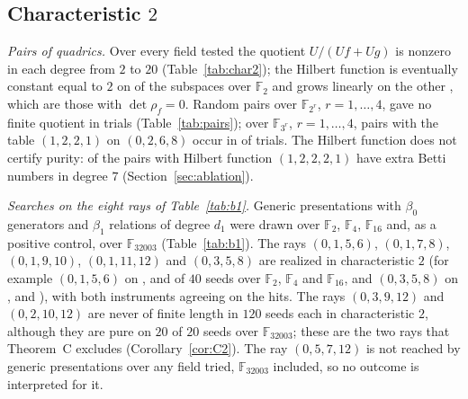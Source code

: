 \documentclass[11pt]{article}
\theoremstyle{definition}
\theoremstyle{remark}
\newcommand{\Q}{\mathbb{Q}}
\newcommand{\F}{\mathbb{F}}
\begin{document}
\begin{table}[htbp]
\centering\footnotesize

\caption{The modules $M_e=U/U(x^e,y^e)$ computed exactly over $\Q$ for $e=2,\dots,8$: the length, the socle (degree, weight), the number of nonzero (weight, degree) pieces, the primes $p\le23$ at which the quotient over $\F_p$ is not pure for $e\le5$, the agreement of the $k[z]$-structure with the pattern for $e\le5$, and the computation time in seconds; dashes mark quantities computed only for $e\le5$.}
\label{tab:family}
\end{table}

\subsection{Characteristic \texorpdfstring{$2$}{2}}

\emph{Pairs of quadrics.} Over every field tested the quotient $U/(Uf+Ug)$ is nonzero in each degree from $2$ to $20$ (Table~\ref{tab:char2}); the Hilbert function is eventually constant equal to $2$ on \nevTwoGFtwo{} of the \nsubGFtwo{} subspaces over $\F_2$ and grows linearly on the other \ngrowGFtwo{}, which are those with $\det\rho_f=0$. Random pairs over $\F_{2^r}$, $r=1,\dots,4$, gave no finite quotient in \npairsCharTwo{} trials (Table~\ref{tab:pairs}); over $\F_{3^r}$, $r=1,\dots,4$, pairs with the table $(1,2,2,1)$ on $(0,2,6,8)$ occur in \npairsCharThreeHits{} of \npairsCharThree{} trials. The Hilbert function does not certify purity: \npairsRightHFWrongTable{} of the \npairsRightHF{} pairs with Hilbert function $(1,2,2,2,1)$ have extra Betti numbers in degree $7$ (Section~\ref{sec:ablation}).

\begin{table}[htbp]
\centering\footnotesize

\caption{Random pairs of quadrics over $\F_{2^r}$ and $\F_{3^r}$ (20 seeds per field): how many give a finite length quotient, how many are still nonzero at degree $14$, and how many have the Betti table $(1,2,2,1)$ on $(0,2,6,8)$; in characteristic $2$ no pair is finite, in characteristic $3$ the table occurs on most pairs over the larger fields.}
\label{tab:pairs}
\end{table}

\emph{Searches on the eight rays of Table~\ref{tab:b1}.} Generic presentations with $\beta_0$ generators and $\beta_1$ relations of degree $d_1$ were drawn over $\F_{2}$, $\F_4$, $\F_{16}$ and, as a positive control, over $\F_{32003}$ (Table~\ref{tab:b1}). The rays $(0,1,5,6)$, $(0,1,7,8)$, $(0,1,9,10)$, $(0,1,11,12)$ and $(0,3,5,8)$ are realized in characteristic $2$ (for example $(0,1,5,6)$ on \nbOneSixTwo{}, \nbOneSixFour{} and \nbOneSixSixteen{} of $40$ seeds over $\F_2$, $\F_4$ and $\F_{16}$, and $(0,3,5,8)$ on \nbOneFiveEightTwo{}, \nbOneFiveEightFour{} and \nbOneFiveEightSixteen{}), with both instruments agreeing on the hits. The rays $(0,3,9,12)$ and $(0,2,10,12)$ are never of finite length in $120$ seeds each in characteristic $2$, although they are pure on $20$ of $20$ seeds over $\F_{32003}$; these are the two rays that Theorem~C excludes (Corollary~\ref{cor:C2}). The ray $(0,5,7,12)$ is not reached by generic presentations over any field tried, $\F_{32003}$ included, so no outcome is interpreted for it.
\end{document}
